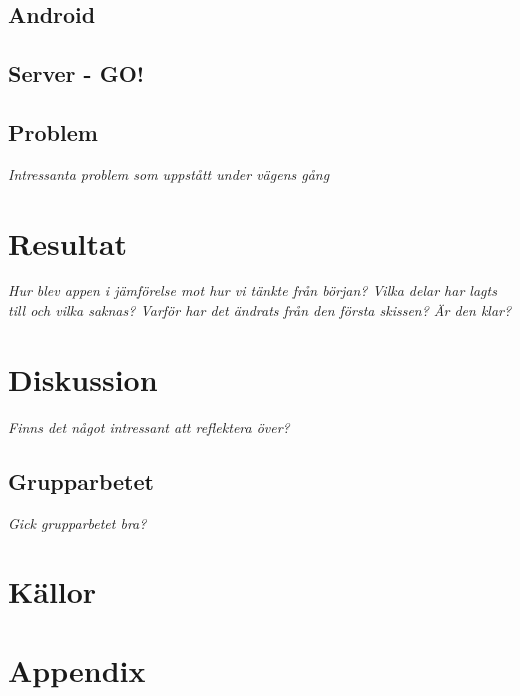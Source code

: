 \documentclass[11pt,a4paper]{article}
\begin{document}
\subsection{Android}

\subsection{Server - GO!}

\subsection{Problem}
\textit{Intressanta problem som uppstått under vägens gång}


\section{Resultat}
\textit{Hur blev appen i jämförelse mot hur vi tänkte från början? Vilka delar har lagts till och vilka saknas? Varför har det ändrats från den första skissen? Är den klar?}


\section{Diskussion}
\textit{Finns det något intressant att reflektera över?}

\subsection{Grupparbetet}
\textit{Gick grupparbetet bra?}

\section{Källor}

\section{Appendix}
\end{document}
